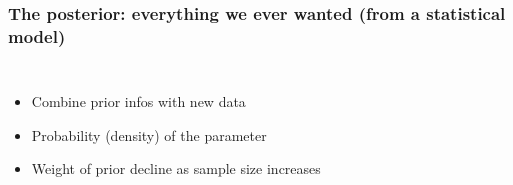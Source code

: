 \documentclass{beamer}
\begin{document}
 
  \begin{frame}
  \frametitle{\bf The posterior: everything we ever wanted (from a statistical model)}
  
  \begin{columns}
    \begin{itemize}
     \item Combine prior infos with new data
     \item Probability (density) of the parameter 
     \item Weight of prior decline as sample size increases
    \end{itemize}
    

\end{columns}
\end{frame}
\end{document}
